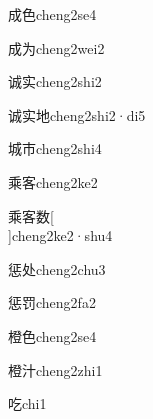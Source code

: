 \begin{verbete}[6;6]{成色}{cheng2se4}
\end{verbete}

\begin{verbete}[6;4]{成为}{cheng2wei2}
\end{verbete}

\begin{verbete}[8;8]{诚实}{cheng2shi2}
\end{verbete}

\begin{verbete}[8;8;6]{诚实地}{cheng2shi2·di5}
\end{verbete}

\begin{verbete}[9;5]{城市}{cheng2shi4}
\end{verbete}

\begin{verbete}[10;9]{乘客}{cheng2ke2}
\end{verbete}

\begin{verbete}[10;9;13]{乘客数}[\\]{cheng2ke2·shu4}
\end{verbete}

\begin{verbete}[12;5]{惩处}{cheng2chu3}
\end{verbete}

\begin{verbete}[12;9]{惩罚}{cheng2fa2}
\end{verbete}

\begin{verbete}[16;6]{橙色}{cheng2se4}
\end{verbete}

\begin{verbete}[16;5]{橙汁}{cheng2zhi1}
\end{verbete}

\begin{verbete}[6]{吃}{chi1}
\end{verbete}

